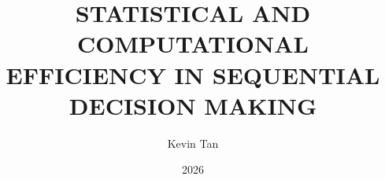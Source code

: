\documentclass[11pt]{report}
\title{STATISTICAL AND COMPUTATIONAL EFFICIENCY IN SEQUENTIAL DECISION MAKING}
\author{Kevin Tan}
\date{2026}
\begin{document}
\makespecializationtitle
\setcounter{page}{2}

\makecopyright
\makededication
\makeacknowledgment
\makeabstract
\tableofcontents

\clearpage {} {} \begin{singlespacing} \listoftables \end{singlespacing}
\clearpage {} {} \begin{singlespacing} \listoffigures \end{singlespacing}

\begin{mainf}
\clearpage
\clearpage
\clearpage
\clearpage
\clearpage
\clearpage
\clearpage
\clearpage
\end{mainf}

\begin{append}
\clearpage
\clearpage
\clearpage
\clearpage
\clearpage
\clearpage
\end{append}
\begin{bibliof}

\end{bibliof}
\end{document}
